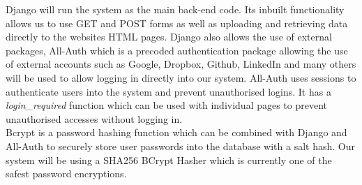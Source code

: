 \documentclass[../main.tex]{subfiles}
\begin{document}
\raggedright
Django will run the system as the main back-end code. Its inbuilt functionality allows us to use GET and POST forms as well as uploading and retrieving data directly to the websites HTML pages. Django also allows the use of external packages, All-Auth\cite{allauth} which is a precoded authentication package allowing the use of external accounts such as Google, Dropbox, Github, LinkedIn and many others will be used to allow logging in directly into our system. All-Auth uses sessions to authenticate users into the system and prevent unauthorised logins. It has a \textit{login\_required} function which can be used with individual pages to prevent unauthorised accesses without logging in. \\[4mm]

Bcrypt\cite{bcrypt} is a password hashing function which can be combined with Django and All-Auth to securely store user passwords into the database with a salt hash. Our system will be using a SHA256 BCrypt Hasher which is currently one of the safest password encryptions\cite{bcryptpower}. 
  
\end{document}
